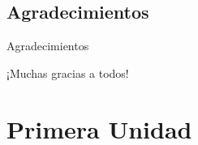 \documentclass[11pt,a4paper,openright]{book}
\begin{document}
\chapter*{Agradecimientos}
Agradecimientos %

¡Muchas gracias a todos!

\tableofcontents %
\cleardoublepage
{}
\part{Primera Unidad}
 
%
%
%

%
%
%

% 
%
%
\end{document}
